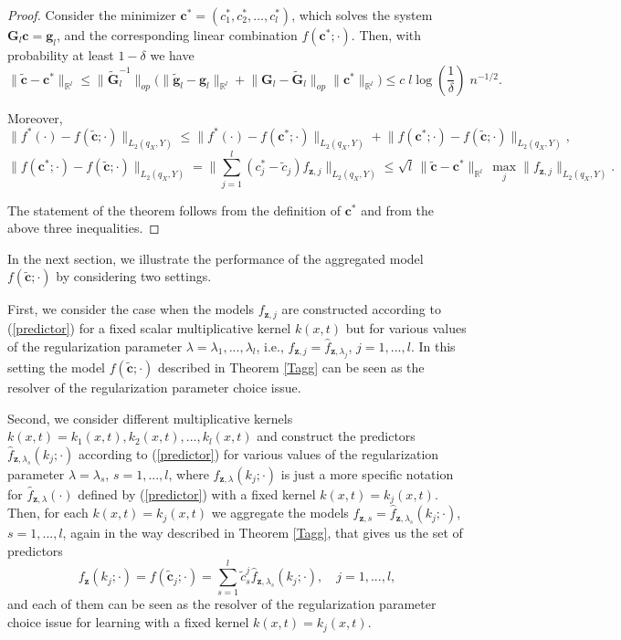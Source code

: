 \documentclass[twoside,11pt]{article}
\begin{document}
\begin{proof}
Consider the minimizer $\mathbf{c}^*= (c^*_1, c^*_2, \ldots, c^*_l)$, which solves the system $\mathbf{G}_l\mathbf{c} = \mathbf{g}_l$, and the corresponding linear combination $f(\mathbf{c}^*;\cdot)$. 
Then, with probability at least $1-\delta$ we have
\[
\big\|\widetilde{\mathbf{c}}-\mathbf{c}^*\big\|_{\mathbb{R}^l} \leq \|\widetilde{\mathbf{G}}_l^{-1}\|_{op}
\Big( \big\| \tilde{\mathbf{g}}_l - \mathbf{g}_l \big\|_{\mathbb{R}^l} + \big\|\mathbf{G}_l-\widetilde{\mathbf{G}}_l\big\|_{op}\|\mathbf{c}^*\|_{\mathbb{R}^l}\Big)
\leq c\;l \log \left(\frac{1}{\delta} \right)  \; n^{-1/2}.
\]

\noindent
Moreover,
\[
\big\|f^*(\cdot) - f(\widetilde{\mathbf{c}};\cdot)\big\|_{L_2(q_X,Y)} \leq \big\|f^*(\cdot) - f(\mathbf{c}^*;\cdot)\big\|_{L_2(q_X,Y)} + \big\|f(\mathbf{c}^*;\cdot) - f(\widetilde{\mathbf{c}};\cdot)\big\|_{L_2(q_X,Y)},
\]
\[
\big\|f(\mathbf{c}^*;\cdot) - f(\widetilde{\mathbf{c}};\cdot)\big\|_{L_2(q_X,Y)} 
= \Big\|\sum_{j=1}^l (c^*_j-\tilde{c}_j) f_{\mathbf{z},j}\Big\|_{L_2(q_X,Y)}
\leq \sqrt{l}\,\big\|\widetilde{\mathbf{c}}-\mathbf{c}^*\big\|_{\mathbb{R}^l}\,\max_j\|f_{\mathbf{z}, j}\|_{L_2(q_X,Y)}.
\]

The statement of the theorem follows from the definition of $\mathbf{c}^*$ and from the above three inequalities.
\end{proof}

In the next section, we illustrate the performance of the aggregated model $f(\widetilde{\mathbf{c}};\cdot)$ by considering two settings. 

First, we consider the case when the models $f_{\mathbf{z},j}$ are constructed according to (\ref{predictor})  for a fixed scalar multiplicative kernel $k(x,t)$ but for various values of the regularization parameter $\lambda =  \lambda_1,...,\lambda_l$, i.e., $f_{\mathbf{z},j} = \widehat{f}_{\mathbf{z},\lambda_j} $, $j= 1,...,l$. In this setting the model $f(\widetilde{\mathbf{c}};\cdot)$ described in Theorem \ref{Tagg} can be seen as the resolver of the regularization parameter choice issue.

Second, we consider different multiplicative kernels $k(x,t) =k_1(x,t), k_2(x,t),...,k_l(x,t) $ and construct the predictors $\widehat{f}_{\mathbf{z},\lambda_{s} }(k_j; \cdot) $ according to (\ref{predictor}) for various values of the regularization parameter $\lambda =  \lambda_{s}$, $s=1,...,l$, where $\widehat{f}_{\mathbf{z},\lambda }(k_j; \cdot) $ is just a more specific notation for $\widehat{f}_{\mathbf{z},\lambda}(\cdot)$ defined by (\ref{predictor}) with a fixed kernel $k(x,t) =k_j(x,t)$. Then,  for each $k(x,t) =k_j(x,t)$ we aggregate the models $f_{\mathbf{z},s} = \widehat{f}_{\mathbf{z},\lambda_{s} }(k_j; \cdot)$, $s= 1,...,l$,  again in the way described in Theorem \ref{Tagg}, that gives us the set of predictors 
\begin{equation}\label{agglam}
f_{\mathbf{z}}(k_j; \cdot) = f(\widetilde{\mathbf{c}}_j;\cdot)  = \sum_{s=1}^l \tilde{c}^j_s \widehat{f}_{\mathbf{z},\lambda_{s} }(k_j; \cdot), \quad j = 1,...,l,
\end{equation}
and each of them can be seen as the resolver of the regularization parameter choice issue for learning with a fixed kernel $k(x,t) =k_j(x,t)$.
\end{document}

